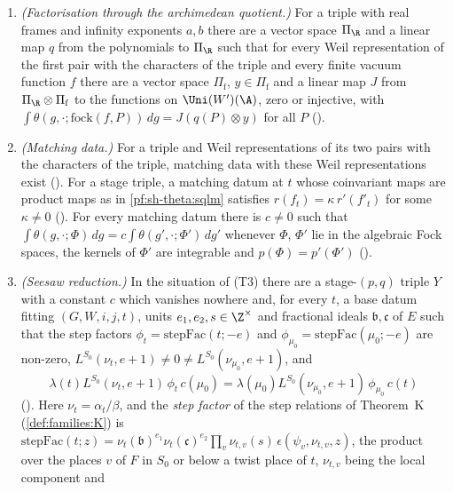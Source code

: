 \begin{enumerate}[label=(\roman*),leftmargin=*]
\item\label{pf:sh-theta:c:ktype} \emph{(Factorisation through the archimedean quotient.)} For a triple with real frames and infinity
exponents $a,b$ there are a vector space $\Pi_\R$ and a linear map $q$ from the polynomials to $\Pi_\R$ such that for every Weil
representation of the first pair with the characters of the triple and every finite vacuum function $f$ there are a vector space
$\Pi_{\mathrm f}$, $y\in\Pi_{\mathrm f}$ and a linear map $J$ from $\Pi_\R\otimes\Pi_{\mathrm f}$ to the functions on $\Uni(W')(\A)$,
zero or injective, with $\int\theta(g,\cdot;\mathrm{fock}(f,P))\,dg=J(q(P)\otimes y)$ for all $P$
().
\item\label{pf:sh-theta:c:match} \emph{(Matching data.)} For a triple and Weil representations of its two pairs with the
characters of the triple, matching data with these Weil representations exist
(). For a stage triple, a matching datum at $t$ whose coinvariant maps are
product maps as in \cref{pf:sh-theta:sqlm} satisfies $r(f_t)=\kappa\,r'(f'_t)$ for some $\kappa\ne0$
(). For every matching datum there is $c\ne0$ such that
$\int\theta(g,\cdot;\Phi)\,dg=c\int\theta(g',\cdot;\Phi')\,dg'$ whenever $\Phi$, $\Phi'$ lie in the algebraic Fock spaces, the kernels
of $\Phi'$ are integrable and $p(\Phi)=p'(\Phi')$ ().
\item\label{pf:sh-theta:c:seesaw} \emph{(Seesaw reduction.)} In the situation of (T3) there are a stage-$(p,q)$ triple $Y$ with a
constant $c$ which vanishes nowhere and, for every $t$, a base datum fitting $(G,W,i,j,t)$, units $e_1,e_2,s\in\Z^\times$ and
fractional ideals $\mathfrak b,\mathfrak c$ of $E$ such that the step factors $\phi_t=\mathrm{stepFac}(t;-e)$ and
$\phi_{\mu_0}=\mathrm{stepFac}(\mu_0;-e)$ are non-zero, $L^{S_0}(\nu_t,e+1)\ne0\ne L^{S_0}(\nu_{\mu_0},e+1)$, and
\[
\lambda(t)L^{S_0}(\nu_t,e+1)\,\phi_t\,c(\mu_0)=\lambda(\mu_0)L^{S_0}(\nu_{\mu_0},e+1)\,\phi_{\mu_0}\,c(t)
\]
(). Here $\nu_t=\alpha_t/\beta$, and the \emph{step factor} of the
step relations of Theorem~K (\cref{def:families:K}) is
$\mathrm{stepFac}(t;z)=\nu_t(\mathfrak b)^{e_1}\nu_t(\mathfrak c)^{e_2}\prod_{v}\nu_{t,v}(s)\,\epsilon(\psi_v,\nu_{t,v},z)$,
the product over the places $v$ of $F$ in $S_0$ or below a twist place of $t$, $\nu_{t,v}$ being the local component and

\end{enumerate}

